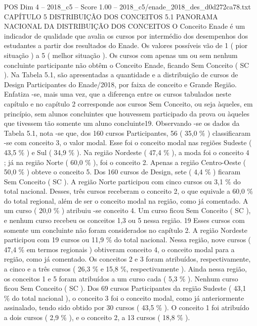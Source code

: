 \begin{textsample}{POS Dim 4 – 2018\_c5 – Score 1.00 – 2018\_c5/enade\_2018\_des\_d0d272ca78.txt}  \label{ex:f4_pos_221}
CAPÍTULO 5 DISTRIBUIÇÃO DOS CONCEITOS 5.1 PANORAMA NACIONAL DA DISTRIBUIÇÃO DOS CONCEITOS O Conceito Enade é um indicador de qualidade que avalia os cursos por intermédio dos desempenhos dos estudantes a partir dos resultados do Enade.
Os valores possíveis vão de 1 ( pior situação ) a 5 ( melhor situação ).
Os cursos com apenas um ou sem nenhum concluinte participante não obtêm o Conceito Enade, ficando Sem Conceito ( SC ).
Na Tabela 5.1, são apresentadas a quantidade e a distribuição de cursos de Design Participantes do Enade/2018, por faixa de conceito e Grande Região.
Enfatiza -se, mais uma vez, que a diferença entre os cursos tabulados neste capítulo e no capítulo 2 corresponde aos cursos Sem Conceito, ou seja àqueles, em princípio, sem alunos concluintes que houvessem participado da prova ou àqueles que tivessem tão somente um aluno concluinte19.
Observando -se os dados da Tabela 5.1, nota -se que, dos 160 cursos Participantes, 56 ( 35,0 \% ) classificaram -se com conceito 3, o valor modal.
Esse foi o conceito modal nas regiões Sudeste ( 43,5 \% ) e Sul ( 34,9 \% ).
Na região Nordeste ( 47,4 \% ), a moda foi o conceito 4 ; já na região Norte ( 60,0 \% ), foi o conceito 2.
Apenas a região Centro-Oeste ( 50,0 \% ) obteve o conceito 5.
Dos 160 cursos de Design, sete ( 4,4 \% ) ficaram Sem Conceito ( SC ).
A região Norte participou com cinco cursos ou 3,1 \% do total nacional.
Desses, três cursos receberam o conceito 2, o que equivale a 60,0 \% do total regional, além de ser o conceito modal na região, como já comentado.
A um curso ( 20,0 \% ) atribuiu -se conceito 4.
Um curso ficou Sem Conceito ( SC ), e nenhum curso recebeu os conceitos 1,3 ou 5 nessa região. 19 Esses cursos com somente um concluinte não foram considerados no capítulo 2.
A região Nordeste participou com 19 cursos ou 11,9 \% do total nacional.
Nessa região, nove cursos ( 47,4 \% em termos regionais ) obtiveram conceito 4, o conceito modal para a região, como já comentado.
Os conceitos 2 e 3 foram atribuídos, respectivamente, a cinco e a três cursos ( 26,3 \% e 15,8 \%, respectivamente ).
Ainda nessa região, os conceitos 1 e 5 foram atribuídos a um curso cada ( 5,3 \% ).
Nenhum curso ficou Sem Conceito ( SC ).
Dos 69 cursos Participantes da região Sudeste ( 43,1 \% do total nacional ), o conceito 3 foi o conceito modal, como já anteriormente assinalado, tendo sido obtido por 30 cursos ( 43,5 \% ).
O conceito 1 foi atribuído a dois cursos ( 2,9 \% ), e o conceito 2, a 13 cursos ( 18,8 \% ).

\end{textsample}
